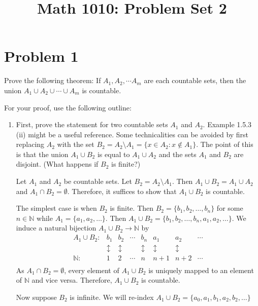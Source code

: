 \documentclass[11pt]{article}
\title{Math 1010: Problem Set 2}
\date{}
\author{}
\numberwithin{equation}{section}
\theoremstyle{definition}
\theoremstyle{remark}
\newcommand{\N}{\mathbb{N}}
\begin{document}
\maketitle
\vspace*{-1in}
  
\section*{Problem 1 }
Prove the following theorem: If $A_1,A_2,\cdots A_m$ are each countable sets, then the union $A_1\cup A_2\cup \cdots \cup A_m$ is countable. 

For your proof, use the following outline: 

\begin{enumerate}[label=(\alph*)]
    \item First, prove the statement for two countable sets $A_1$ and $A_2$. Example 1.5.3 (ii)
    might be a useful reference. Some technicalities can be avoided by first replacing $A_2$ with the set $B_2=A_2\setminus A_1=\{x\in A_2 : x\notin A_1\}$. The point of this is that the union $A_1\cup B_2$ is equal to $A_1\cup A_2$ and the sets $A_1$ and $B_2$ are disjoint. (What happens if $B_2$ is finite?)

        \color{blue}
            Let $A_1$ and $A_2$ be countable sets. Let $B_2 = A_2 \setminus A_1$. Then $A_1 \cup B_2 = A_1 \cup A_2$ and $A_1 \cap B_2 = \emptyset$. Therefore, it suffices to show that $A_1 \cup B_2$ is countable. 

            The simplest case is when $B_2$ is finite. Then $B_2 = \{b_1, b_2, \dots, b_n\}$ for some $n \in \N$ while $A_1 = \{a_1, a_2, \dots\}$. Then $A_1 \cup B_2 = \{b_1, b_2, \dots, b_n, a_1, a_2, \dots\}$. We induce a natural bijection $A_1 \cup B_2 \to \N$ by 
            \[\begin{array}{cccccccc}
                A_1 \cup B_2: & b_1 & b_2 & \cdots & b_n & a_1 & a_2 & \cdots\\
                & \updownarrow & \updownarrow & & \updownarrow & \updownarrow & \updownarrow &\\
                \N: & 1 & 2 & \cdots & n & n+1 & n+2 & \cdots\\
            \end{array}\]
            As $A_1 \cap B_2 = \emptyset$, every element of $A_1 \cup B_2$ is uniquely mapped to an element of $\N$ and vice versa. Therefore, $A_1 \cup B_2$ is countable.

            Now suppose $B_2$ is infinite. We will re-index $A_1 \cup B_2 = \{a_0, a_1, b_1, a_2, b_2, \dots\}$
            

\end{enumerate}
\end{document}
